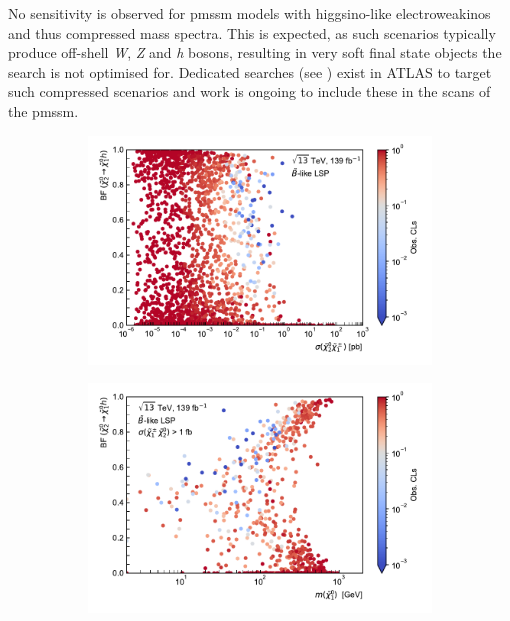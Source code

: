 No sensitivity is observed for \gls{pmssm} models with higgsino-like electroweakinos and thus compressed mass spectra. This is expected, as such scenarios typically produce off-shell \textit{W}, \textit{Z} and \textit{h} bosons, resulting in very soft final state objects the \onelepton search is not optimised for. Dedicated searches (see \eg {}\cite{SUSY-2018-16}) exist in ATLAS to target such compressed scenarios and work is ongoing to include these in the scans of the \gls{pmssm}.

 \begin{figure}
	\centering
	\begin{subfigure}[b]{0.5\linewidth}
		\centering\includegraphics[width=\textwidth]{scatter/fig_scatter_xsec_BFHiggs_bino}
		\caption{\label{fig:fig_scatter_xsec_BFHiggs_bino}}
	\end{subfigure}\hfill
	\begin{subfigure}[b]{0.5\linewidth}
		\centering\includegraphics[width=\textwidth]{scatter/fig_scatter_mchi10_BFHiggs_bino_withXsecCut}

\end{subfigure}
\end{figure}

